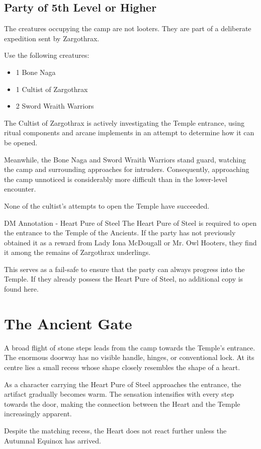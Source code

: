 \subsection*{Party of 5th Level or Higher}
{\entryfont The creatures occupying the camp are not looters. They are part of a deliberate expedition sent by Zargothrax.

Use the following creatures:
\begin{itemize}
	\item 1 Bone Naga
	\item 1 Cultist of Zargothrax
	\item 2 Sword Wraith Warriors
\end{itemize}
The Cultist of Zargothrax is actively investigating the Temple entrance, using ritual components and arcane implements in an attempt to determine how it can be opened.

Meanwhile, the Bone Naga and Sword Wraith Warriors stand guard, watching the camp and surrounding approaches for intruders. Consequently, approaching the camp unnoticed is considerably more difficult than in the lower-level encounter.

None of the cultist's attempts to open the Temple have succeeded.}

\begingroup
	\DndSetThemeColor[PhbTan]
	\begin{DndComment}{DM Annotation - Heart Pure of Steel}
		The Heart Pure of Steel is required to open the entrance to the Temple of the Ancients. If the party has not previously obtained it as a reward from Lady Iona McDougall or Mr. Owl Hooters, they find it among the remains of Zargothrax underlings.

		This serves as a fail-safe to ensure that the party can always progress into the Temple. If they already possess the Heart Pure of Steel, no additional copy is found here.
	\end{DndComment}
\endgroup

\section*{The Ancient Gate}
{\entryfont A broad flight of stone steps leads from the camp towards the Temple's entrance. The enormous doorway has no visible handle, hinges, or conventional lock. At its centre lies a small recess whose shape closely resembles the shape of a heart.

As a character carrying the Heart Pure of Steel approaches the entrance, the artifact gradually becomes warm. The sensation intensifies with every step towards the door, making the connection between the Heart and the Temple increasingly apparent.

Despite the matching recess, the Heart does not react further unless the Autumnal Equinox has arrived.}

